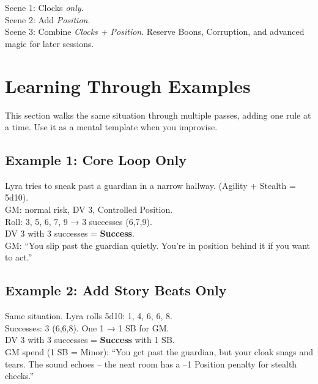 \begin{tcolorbox}[colback=gray!5,colframe=gray!75!black,title=\textbf{Lane Marker: One New Idea at a Time}]
\footnotesize
Scene 1: Clocks \emph{only}.\\
Scene 2: Add \emph{Position}.\\
Scene 3: Combine \emph{Clocks + Position}. Reserve Boons, Corruption, and advanced magic for later sessions.
\end{tcolorbox}

\section{Learning Through Examples}
\label{sec:learning-examples}

This section walks the same situation through multiple passes, adding one rule at a time. Use it as a mental template when you improvise.

\subsection*{Example 1: Core Loop Only}
\label{subsec:ex-core-only}
\begin{tcolorbox}[colback=gray!3,colframe=gray!60,title=\textbf{Example 1 – No SB, No Boons}]
Lyra tries to sneak past a guardian in a narrow hallway. (Agility + Stealth = 5d10).\\
GM: normal risk, DV 3, Controlled Position.\\
Roll: 3, 5, 6, 7, 9 → 3 successes (6,7,9).\\[0.3em]
DV 3 with 3 successes = \textbf{Success}.\\[0.3em]
GM: “You slip past the guardian quietly. You’re in position behind it if you want to act.”
\end{tcolorbox}

\subsection*{Example 2: Add Story Beats Only}
\label{subsec:ex-sb-only}
\begin{tcolorbox}[colback=gray!3,colframe=gray!60,title=\textbf{Example 2 – Adding Story Beats}]
Same situation. Lyra rolls 5d10: 1, 4, 6, 6, 8.\\
Successes: 3 (6,6,8). One 1 → 1 SB for GM.\\[0.3em]
DV 3 with 3 successes = \textbf{Success} with 1 SB.\\[0.3em]
GM spend (1 SB = Minor): “You get past the guardian, but your cloak snags and tears. The sound echoes – the next room has a –1 Position penalty for stealth checks.”
\end{tcolorbox}

